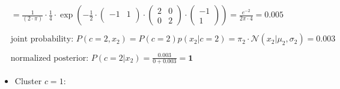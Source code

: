 \documentclass[12pt]{article}
\begin{document}
\begin{enumerate}
\begin{enumerate}[label=\arabic*)]
\begin{itemize}[label=]
\begin{equation*}
\begin{aligned}
                    &= \frac{1}{(2 \cdot \pi)} \cdot \frac{1}{4} \cdot \exp \left( -\frac{1}{2} \cdot \begin{pmatrix}
                    -1 & 1\\
                    \end{pmatrix} \cdot \begin{pmatrix}
                    2 & 0\\
                    0 & 2
                    \end{pmatrix} \cdot \begin{pmatrix}
                    -1\\
                    1
                    \end{pmatrix} \right) = \frac{e^{-2}}{2 \pi \cdot 4} = \mathbf{0.005}\\
                    \\
                    &\text{joint probability: } P(c=2, x_2) =  P(c=2)p(x_2|c=2) = \pi_2 \cdot \mathcal{N}(x_2| \mu_2, \sigma_2) = \mathbf{0.003}\\
                    \\
                    &\text{normalized posterior: } P(c=2|x_2) = \frac{0.003}{0 + 0.003} = \mathbf{1}
                \end{aligned}
            \end{equation*}
        \end{itemize}

        \vspace{10pt}

        \vspace{10pt}
        \begin{itemize}[label=]
            \item Cluster $c=1$:
                

\end{itemize}
\end{enumerate}
\end{enumerate}
\end{document}
